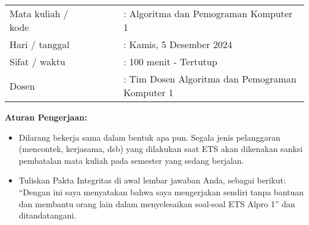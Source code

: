 \documentclass[10pt,openany,letterpaper]{article}
\begin{document}
\begin{flushleft}
    \begin{tabularx}{\textwidth}{l c l}
        Mata kuliah / kode &$\quad\qquad$& : Algoritma dan Pemograman Komputer 1\\
        Hari / tanggal && : Kamis, 5 Desember 2024\\
        Sifat / waktu && : 100 menit - Tertutup\\
        Dosen && : Tim Dosen Algoritma dan Pemograman Komputer 1\\
    \end{tabularx}
\end{flushleft}

\indent
\textbf{Aturan Pengerjaan:}
\begin{itemize}
    \item Dilarang bekerja sama dalam bentuk apa pun. Segala jenis pelanggaran (mencontek, kerjasama, dsb) yang dilakukan saat ETS akan dikenakan sanksi pembatalan mata kuliah pada semester yang sedang berjalan.
    \item Tuliskan Pakta Integritas di awal lembar jawaban Anda, sebagai berikut: ``Dengan ini saya menyatakan bahwa saya mengerjakan sendiri tanpa bantuan dan membantu orang lain dalam menyelesaikan soal-soal ETS Alpro 1'' dan ditandatangani.
\end{itemize}
\end{document}
